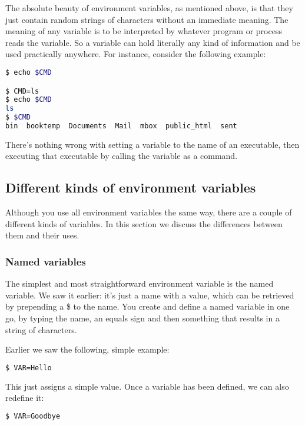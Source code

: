The absolute beauty of environment variables, as mentioned above, is that they
just contain random strings of characters without an immediate meaning. The
meaning of any variable is to be interpreted by whatever program or process
reads the variable. So a variable can hold literally any kind of information
and be used practically anywhere. For instance, consider the following example:
\lstset{basicstyle=\scriptsize, numbers=left, captionpos=b, tabsize=4}
\begin{lstlisting}[caption=Environment variables are more flexible than you thought...,language={bash},
xleftmargin=15pt, label=lst:environmentvariables]
$ echo $CMD

$ CMD=ls
$ echo $CMD
ls
$ $CMD
bin  booktemp  Documents  Mail  mbox  public_html  sent
\end{lstlisting}

There's nothing wrong with setting a variable to the name of an executable,
then executing that executable by calling the variable as a command.

\subsection{Different kinds of environment variables}
Although you use all environment variables the same way, there are a couple of
different kinds of variables. In this section we discuss the differences
between them and their uses.

\subsubsection{Named variables}
The simplest and most straightforward environment variable is the named
variable. We saw it earlier: it's just a name with a value, which can be
retrieved by prepending a \$ to the name. You create and define a named
variable in one go, by typing the name, an equals sign and then something that
results in a string of characters.

Earlier we saw the following, simple example:
\lstset{basicstyle=\scriptsize, numbers=left, captionpos=b, tabsize=4}
\begin{lstlisting}[caption=Assigning a simple value to a variable,language={bash},
xleftmargin=15pt,label=lst:Assigningasimplevaluetoavariable1]
$ VAR=Hello
\end{lstlisting}

This just assigns a simple value. Once a variable has been defined, we can also
redefine it:
\lstset{basicstyle=\scriptsize, numbers=left, captionpos=b, tabsize=4}
\begin{lstlisting}[caption=Assigning a simple value to a variable,language={bash},
xleftmargin=15pt,label=lst:Assigningasimplevaluetoavariable2]
$ VAR=Goodbye
\end{lstlisting}

